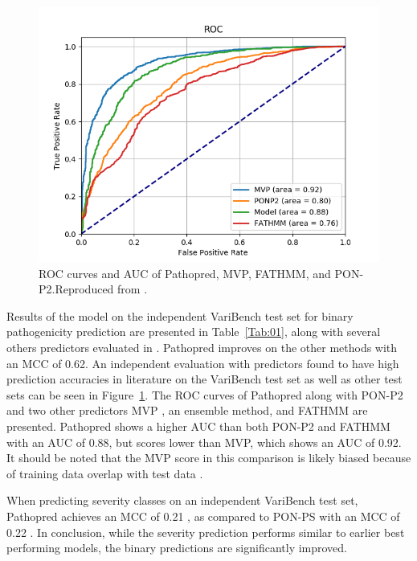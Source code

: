 \documentclass{bioinfo}
\begin{document}
\begin{figure}[!tpb]
\centerline{\includegraphics[scale=0.5]{varibench_tolerance_test_ROC.png}}
\caption{ROC curves and AUC of Pathopred, MVP, FATHMM, and PON-P2.\newline Reproduced from \citep{Kvist2018}.}\label{fig:01}
\end{figure}

Results of the model on the independent VariBench test set for binary pathogenicity prediction are presented in Table~\ref{Tab:01}, along with several others predictors evaluated in \citep{Niroula2015}. Pathopred improves on the other methods with an MCC of 0.62. An independent evaluation with predictors found to have high prediction accuracies in literature on the VariBench test set as well as other test sets can be seen in Figure~\ref{fig:01}. The ROC curves of Pathopred along with PON-P2 and two other predictors MVP \citep{Qi2018}, an ensemble method, and FATHMM \citep{Shihab2013} are presented. Pathopred shows a higher AUC than both PON-P2 and FATHMM with an AUC of 0.88, but scores lower than MVP, which shows an AUC of 0.92. It should be noted that the MVP score in this comparison is likely biased because of training data overlap with test data \citep{Kvist2018}. 

When predicting severity classes on an independent VariBench test set, Pathopred achieves an MCC of 0.21 \citep{Kvist2018}, as compared to PON-PS with an MCC of 0.22 \citep{Niroula2017}. In conclusion, while the severity prediction performs similar to earlier best performing models, the binary predictions are significantly improved.
\end{document}
